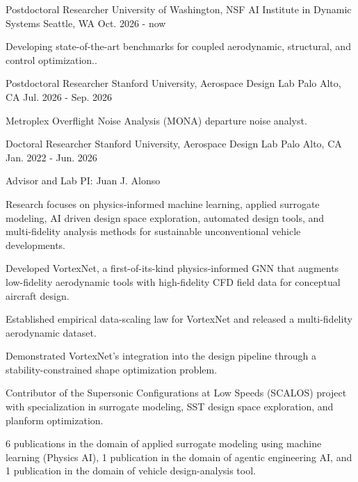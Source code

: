 \begin{cventries}

  \cventry
    {Postdoctoral Researcher} %
    {University of Washington, NSF AI Institute in Dynamic Systems} %
    {Seattle, WA} %
    {Oct. 2026 - now} %
    {\begin{cvitems}
    \item {Developing state-of-the-art benchmarks for coupled aerodynamic, structural, and control optimization..}
    \end{cvitems}
    }

  \cventry
    {Postdoctoral Researcher} %
    {Stanford University, Aerospace Design Lab} %
    {Palo Alto, CA} %
    {Jul. 2026 - Sep. 2026} %
    {\begin{cvitems}
    \item {Metroplex Overflight Noise Analysis (MONA) departure noise analyst.}
       \end{cvitems}
    }



  \cventry
    {Doctoral Researcher} %
    {Stanford University, Aerospace Design Lab} %
    {Palo Alto, CA} %
    {Jan. 2022 - Jun. 2026} %
    {
      \begin{cvitems} %
        \item {Advisor and Lab PI: Juan J. Alonso}
        \item {Research focuses on physics‑informed machine learning, applied surrogate modeling, AI driven design space exploration, automated design tools, and multi‑fidelity analysis methods for sustainable unconventional vehicle developments.}
        \item {Developed VortexNet, a first-of-its-kind physics-informed GNN that augments low-fidelity aerodynamic tools with high-fidelity CFD field data for conceptual aircraft design.}
        \item {Established empirical data-scaling law for VortexNet and released a multi-fidelity aerodynamic dataset.}
        \item {Demonstrated VortexNet’s integration into the design pipeline through a stability-constrained shape optimization problem.}
        \item {Contributor of the Supersonic Configurations at Low Speeds (SCALOS) project with specialization in surrogate modeling, SST design space exploration, and planform optimization.}
        \item {6 publications in the domain of applied surrogate modeling using machine learning (Physics AI), 1 publication in the domain of agentic engineering AI, and 1 publication in the domain of vehicle design-analysis tool.}
      \end{cvitems}
    }


\end{cventries}
